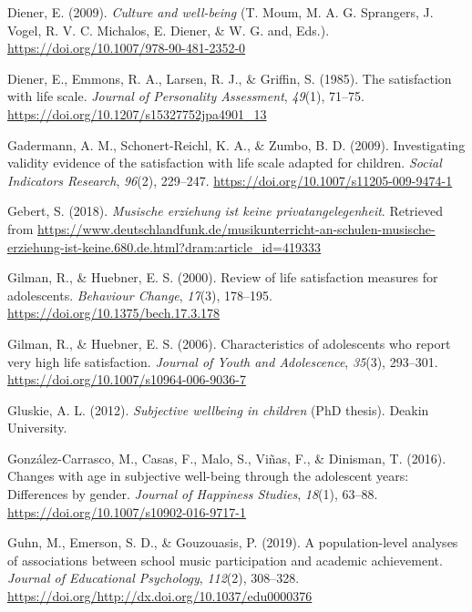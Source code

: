 \documentclass[a4, 12pt]{article}
\begin{document}
\leavevmode\hypertarget{ref-Diener2009}{}%
Diener, E. (2009). \emph{Culture and well-being} (T. Moum, M. A. G. Sprangers, J. Vogel, R. V. C. Michalos, E. Diener, \& W. G. and, Eds.). \url{https://doi.org/10.1007/978-90-481-2352-0}

\leavevmode\hypertarget{ref-Diener1985}{}%
Diener, E., Emmons, R. A., Larsen, R. J., \& Griffin, S. (1985). The satisfaction with life scale. \emph{Journal of Personality Assessment}, \emph{49}(1), 71--75. \url{https://doi.org/10.1207/s15327752jpa4901_13}

\leavevmode\hypertarget{ref-Gadermann2009}{}%
Gadermann, A. M., Schonert-Reichl, K. A., \& Zumbo, B. D. (2009). Investigating validity evidence of the satisfaction with life scale adapted for children. \emph{Social Indicators Research}, \emph{96}(2), 229--247. \url{https://doi.org/10.1007/s11205-009-9474-1}

\leavevmode\hypertarget{ref-Gebert2018}{}%
Gebert, S. (2018). \emph{Musische erziehung ist keine privatangelegenheit}. Retrieved from \url{https://www.deutschlandfunk.de/musikunterricht-an-schulen-musische-erziehung-ist-keine.680.de.html?dram:article_id=419333}

\leavevmode\hypertarget{ref-Gilman2000}{}%
Gilman, R., \& Huebner, E. S. (2000). Review of life satisfaction measures for adolescents. \emph{Behaviour Change}, \emph{17}(3), 178--195. \url{https://doi.org/10.1375/bech.17.3.178}

\leavevmode\hypertarget{ref-Gilman2006}{}%
Gilman, R., \& Huebner, E. S. (2006). Characteristics of adolescents who report very high life satisfaction. \emph{Journal of Youth and Adolescence}, \emph{35}(3), 293--301. \url{https://doi.org/10.1007/s10964-006-9036-7}

\leavevmode\hypertarget{ref-Gluskie2012}{}%
Gluskie, A. L. (2012). \emph{Subjective wellbeing in children} (PhD thesis). Deakin University.

\leavevmode\hypertarget{ref-GonzalezCarrasco2016}{}%
González-Carrasco, M., Casas, F., Malo, S., Viñas, F., \& Dinisman, T. (2016). Changes with age in subjective well-being through the adolescent years: Differences by gender. \emph{Journal of Happiness Studies}, \emph{18}(1), 63--88. \url{https://doi.org/10.1007/s10902-016-9717-1}

\leavevmode\hypertarget{ref-Guhn2019}{}%
Guhn, M., Emerson, S. D., \& Gouzouasis, P. (2019). A population-level analyses of associations between school music participation and academic achievement. \emph{Journal of Educational Psychology}, \emph{112}(2), 308--328. \url{https://doi.org/http://dx.doi.org/10.1037/edu0000376}
\end{document}
